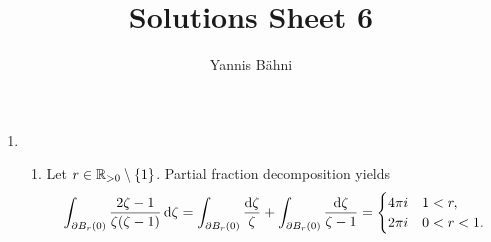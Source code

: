 

\title{Solutions Sheet 6}
\author{Yannis B\"{a}hni}
\address[Yannis B\"{a}hni]{University of Zurich, R\"{a}mistrasse 71, 8006 Zurich}


\maketitle
\thispagestyle{fancy}
\begin{enumerate}[label = \textbf{Exercise \arabic*.},wide = 0pt, itemsep=1.5ex]
	\item
		~
		\begin{enumerate}[label = (\alph*),wide = 0pt, itemsep=1.5ex]
			\item Let $r \in \mathbb{R}_{>0} \setminus \cbr[0]{1}$. Partial fraction decomposition yields
				\begin{align}
					\int_{\partial B_r(0)} \frac{2\zeta - 1}{\zeta(\zeta - 1)}\mathop{}\!\mathrm{d} \zeta = \int_{\partial B_r(0)} \frac{\mathop{}\!\mathrm{d}\zeta}{\zeta} + \int_{\partial B_r(0)}\frac{\mathop{}\!\mathrm{d}\zeta}{\zeta - 1} = \begin{cases}
						4\pi i & 1 < r,\\
						2\pi i & 0 < r < 1.
					\end{cases}
				\end{align} 
		
		
		\end{enumerate}
\end{enumerate}
\printbibliography

